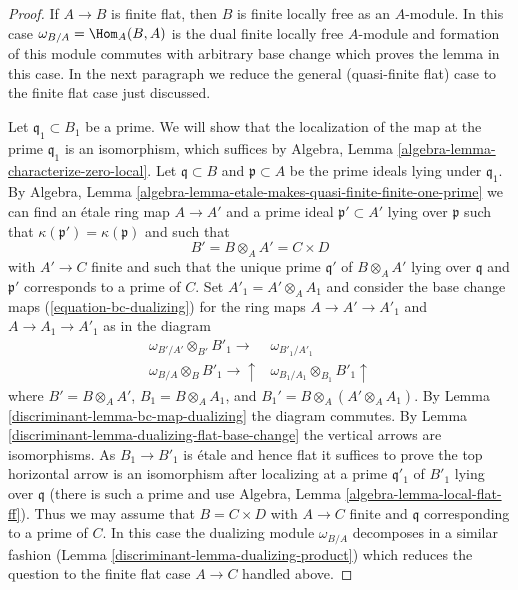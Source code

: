 \begin{proof}

If $A \to B$ is finite flat, then $B$ is finite locally free as an $A$-module.
In this case $\omega_{B/A} = \Hom_A(B, A)$ is the dual finite
locally free $A$-module and formation of this module commutes
with arbitrary base change which proves the lemma in this case.
In the next paragraph we reduce the general (quasi-finite flat)
case to the finite flat case just discussed.

\medskip\noindent
Let $\mathfrak q_1 \subset B_1$ be a prime. We will show that the
localization of the map at the prime $\mathfrak q_1$ is an isomorphism, which
suffices by Algebra, Lemma \ref{algebra-lemma-characterize-zero-local}.
Let $\mathfrak q \subset B$ and $\mathfrak p \subset A$ be the prime
ideals lying under $\mathfrak q_1$. By
Algebra, Lemma \ref{algebra-lemma-etale-makes-quasi-finite-finite-one-prime}
we can find an \'etale ring map $A \to A'$ and a prime
ideal $\mathfrak p' \subset A'$ lying over $\mathfrak p$
such that $\kappa(\mathfrak p') = \kappa(\mathfrak p)$ and
such that
$$
B' = B \otimes_A A' = C \times D
$$
with $A' \to C$ finite and such that the unique prime $\mathfrak q'$
of $B \otimes_A A'$ lying over $\mathfrak q$ and $\mathfrak p'$
corresponds to a prime of $C$. Set $A'_1 = A' \otimes_A A_1$ and
consider the base change maps
(\ref{equation-bc-dualizing}) for the ring maps
$A \to A' \to A'_1$ and $A \to A_1 \to A'_1$ as in the diagram
$$
\begin{array}{cc}\omega_{B'/A'} \otimes_{B'} B'_1 \longrightarrow & \omega_{B'_1/A'_1} \\ \omega_{B/A} \otimes_B B'_1 \longrightarrow\uparrow & \omega_{B_1/A_1} \otimes_{B_1} B'_1 \uparrow\end{array}
$$
where $B' = B \otimes_A A'$, $B_1 = B \otimes_A A_1$, and
$B_1' = B \otimes_A (A' \otimes_A A_1)$. By
Lemma \ref{discriminant-lemma-bc-map-dualizing} the diagram commutes. By
Lemma \ref{discriminant-lemma-dualizing-flat-base-change}
the vertical arrows are isomorphisms.
As $B_1 \to B'_1$ is \'etale and hence flat it suffices
to prove the top horizontal arrow is an isomorphism after localizing
at a prime $\mathfrak q'_1$ of $B'_1$ lying over $\mathfrak q$
(there is such a prime and use
Algebra, Lemma \ref{algebra-lemma-local-flat-ff}).
Thus we may assume that $B = C \times D$ with $A \to C$
finite and $\mathfrak q$ corresponding to a prime of $C$.
In this case the dualizing module $\omega_{B/A}$ decomposes
in a similar fashion (Lemma \ref{discriminant-lemma-dualizing-product})
which reduces the question
to the finite flat case $A \to C$ handled above.
\end{proof}

